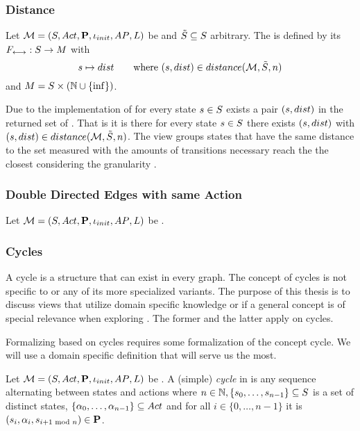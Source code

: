 \documentclass[preview]{standalone}
\begin{document}
\subsubsection{Distance}
\begin{definition}
		Let ${{{\mathcal{M}}}} = {{({S}, {Act}, {\textbf{P}}, {\iota_{init}}, {AP}, {L})}}$ be \chosengraphtypeN and ${\tilde{{S}}} \subseteq {S}$ arbitrary.  The \viewN \viewdistance is defined by its \grpfctN ${{F_{{\longleftrightarrow}}}} : {S} \to {\ensuremath{{M}}}$ with 
		\[
		\state \mapsto \distval \quad \quad \text{where } (\state, \distval) \in \fctdistdefault
		\]
		and $M = {S} \times ({\mathbb{N}} \cup \{\inf\})$.
\end{definition}

Due to the implementation of \fctdistdefault for every state ${s} \in {S}$ exists a pair $({s}, {dist})$ in the returned set of \fctdistdefault. That is it is there for every state ${s} \in {S}$ there exists  $({s}, {dist})$ with $ (\state, \distval)\in \fctdistdefault$. The view groups states that have the same distance to the set measured with the amounts of transitions necessary reach the the closest \smstates considering the granularity \granularity.

\subsubsection{Double Directed Edges with same Action}
\begin{definition}
	Let ${{{\mathcal{M}}}} = {{({S}, {Act}, {\textbf{P}}, {\iota_{init}}, {AP}, {L})}}$ be \chosengraphtypeN.
\end{definition}

\subsubsection{Cycles}
A cycle is a structure that can exist in every graph. The concept of cycles is not specific to \chosengraphtypesN or any of its more specialized variants. The purpose of this thesis is to discuss views that utilize domain specific knowledge or if a general concept is of special relevance when exploring \chosengraphtypeN. The former and the latter apply on cycles.

Formalizing \viewsN based on cycles requires some formalization of the concept cycle. We will use a domain specific definition that will serve us the most.

\begin{definition}
	Let ${{{\mathcal{M}}}} = {{({S}, {Act}, {\textbf{P}}, {\iota_{init}}, {AP}, {L})}}$ be \chosengraphtypeN. A (simple) \emph{cycle} in \chgph is any sequence \cyclesecfull alternating between states and actions where $n \in {\mathbb{N}}, \{{s}_0, \dots, {s}_{n-1}\} \subseteq {S}$ is a set of distinct states,  $\{{\alpha}_0, \dots, {\alpha}_{n-1}\} \subseteq {Act}$ and for all $i \in \{0, \dots, n-1\}$ it is $({s}_i,{\alpha}_i, {s}_{i+1 \text{ mod }n}) \in {\ensuremath{{\textbf{P}}}}$.
\end{definition}
\end{document}
